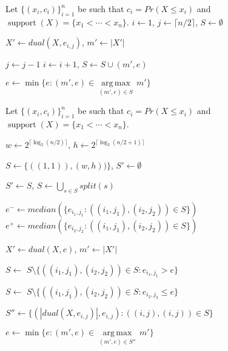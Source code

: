 \documentclass[letterpaper]{article} %
\DeclareMathOperator{\supp}{support}
\begin{document}
\begin{algorithm}
	\DontPrintSemicolon
	Let $\{(x_i, c_i)\}_{i=1}^n$ be such that $c_i=Pr(X \leq x_i)$ and $\supp(X)=\{x_1 < \cdots < x_n\}$.\;
    $i \gets 1$, $j \gets \lceil n/2 \rceil$, $S \gets \emptyset$\;

	{
		
		
		$X' \gets dual(X,e_{i,j})$, $m' \gets |X'|$\;
	
		{
			$j \gets j - 1$
		}
		 {
			$i \gets i + 1$, $S \gets S \cup (m',e)$			
		}
	}
	$e \gets \min\{e\colon (m',e) \in \underset{(m',e)\in S}{\operatorname{arg\,max}}\, m'\}$\;
	
	\caption{$saddlebackApprox(X,m)$}   
	\label{alg:saddleback}
\end{algorithm}


\begin{algorithm}
		\DontPrintSemicolon
		Let $\{(x_i, c_i)\}_{i=1}^n$ be such that $c_i=Pr(X \leq x_i)$ and $\supp(X)=\{x_1 < \cdots < x_n\}$.\;
		
		$w \gets 2^{\lceil \log_2(n/2) \rceil}$,
		$h \gets 2^{\lceil \log_2(n/2+1) \rceil}$ \;
				
		$S \gets  \{ ((1, 1)),(w,h)) \}$, $S' \gets \emptyset$\;
		
		
		{
			$S' \gets S$,
			$S \gets  \bigcup_{s \in S} split(s)$\;
			
			$e^- {\gets} median(\{ e_{i_1,j_1} \colon ((i_1,j_1),(i_2,j_2)) \in S \}) $\;		
			$e^+ {\gets} median(\{ e_{i_2,j_2} \colon ((i_1,j_1),(i_2,j_2)) \in S \}) $\;			

			 {
				$X' \gets dual(X,e)$, $m' \gets |X'|$\;
	
				 {
					$S \gets$ $S \setminus \{ ((i_1,j_1),(i_2,j_2)) \in S \colon e_{i_1,j_1} > e \}$ \;
				}
			
				\Else %
				{
					$S \gets$ $S \setminus \{ ((i_1,j_1),(i_2,j_2)) \in S \colon e_{i_2,j_2} \leq e \}$ \;
				}
			}
		}
	
		$S'' \gets \{(|dual(X,e_{i,j})|,e_{i,j}) \colon ((i,j),(i,j)) \in S\}$\;	
	
		$e \gets \min\{e\colon (m',e) \in \underset{(m',e)\in S''}{\operatorname{arg\,max}}\, m'\}$\;

		\caption{$linApprox(X,m)$}   
		\label{alg:linear}
	\end{algorithm}
\end{document}
